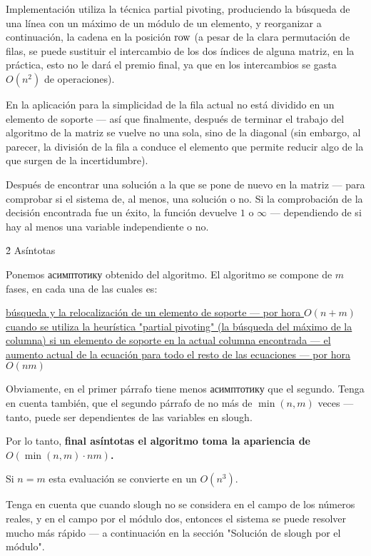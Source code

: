 Implementación utiliza la técnica partial pivoting, produciendo la búsqueda de una línea con un máximo de un módulo de un elemento, y reorganizar a continuación, la cadena en la posición $\rm row$ (a pesar de la clara permutación de filas, se puede sustituir el intercambio de los dos índices de alguna matriz, en la práctica, esto no le dará el premio final, ya que en los intercambios se gasta $O(n^2)$ de operaciones).

En la aplicación para la simplicidad de la fila actual no está dividido en un elemento de soporte --- así que finalmente, después de terminar el trabajo del algoritmo de la matriz se vuelve no una sola, sino de la diagonal (sin embargo, al parecer, la división de la fila a conduce el elemento que permite reducir algo de la que surgen de la incertidumbre).

Después de encontrar una solución a la que se pone de nuevo en la matriz --- para comprobar si el sistema de, al menos, una solución o no. Si la comprobación de la decisión encontrada fue un éxito, la función devuelve $1$ o $\infty$ --- dependiendo de si hay al menos una variable independiente o no.



\h2{ Asíntotas }

Ponemos асимптотику obtenido del algoritmo. El algoritmo se compone de $m$ fases, en cada una de las cuales es:

\ul{
\li búsqueda y la relocalización de un elemento de soporte --- por hora $O(n+m)$ cuando se utiliza la heurística "partial pivoting" (la búsqueda del máximo de la columna)
\li si un elemento de soporte en la actual columna encontrada --- el aumento actual de la ecuación para todo el resto de las ecuaciones --- por hora $O(nm)$
}

Obviamente, en el primer párrafo tiene menos асимптотику que el segundo. Tenga en cuenta también, que el segundo párrafo de no más de $\min(n,m)$ veces --- tanto, puede ser dependientes de las variables en slough.

Por lo tanto, \bf{final asíntotas} el algoritmo toma la apariencia de $O (\min(n,m) \cdot n m)$.

Si $n = m$ esta evaluación se convierte en un $O(n^3)$.

Tenga en cuenta que cuando slough no se considera en el campo de los números reales, y en el campo por el módulo dos, entonces el sistema se puede resolver mucho más rápido --- a continuación en la sección "Solución de slough por el módulo".

